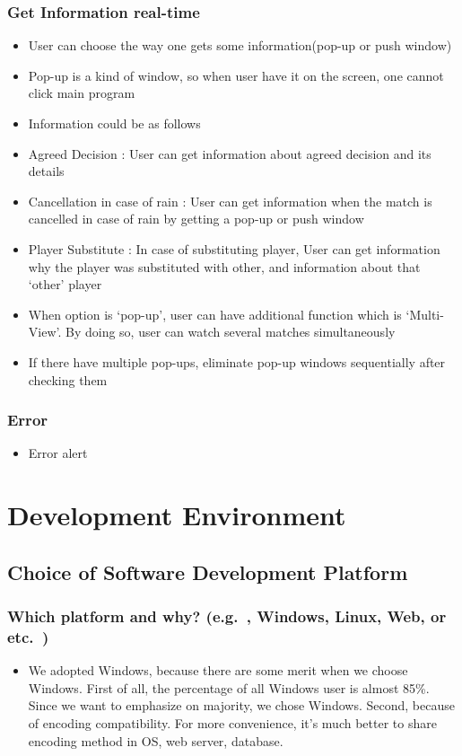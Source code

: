 \documentclass[conference,compsoc, twocolumn]{IEEEtran}
\begin{document}
\subsubsection{Get Information real-time}
\begin{itemize}
\item User can choose the way one gets some information(pop-up or push window)
\item Pop-up is a kind of window, so when user have it on the screen, one cannot click main program
\item Information could be as follows
\item Agreed Decision : User can get information about agreed decision and its details
\item Cancellation in case of rain : User can get information when the match is cancelled in case of rain by getting a pop-up or push window
\item Player Substitute : In case of substituting player, User can get information why the player was substituted with other, and information about that ‘other’ player
\item When option is ‘pop-up’, user can have additional function which is ‘Multi-View’.  By doing so, user can watch several matches simultaneously
\item If there have multiple pop-ups, eliminate pop-up windows sequentially after checking them
\end{itemize}

\subsubsection{Error}
\begin{itemize}
\item Error alert
\end{itemize}



\section{Development Environment}



\subsection{Choice of Software Development Platform}


\subsubsection{Which platform and why? (e.g.\ , Windows, Linux, Web, or etc.\ )}
\begin{itemize}
\item We adopted Windows, because there are some merit when we choose Windows. First of all, the percentage of all Windows user is almost 85\%. Since we want to emphasize on majority, we chose Windows. Second, because of encoding compatibility. For more convenience, it’s much better to share encoding method in OS, web server, database.
\end{itemize}
\end{document}
